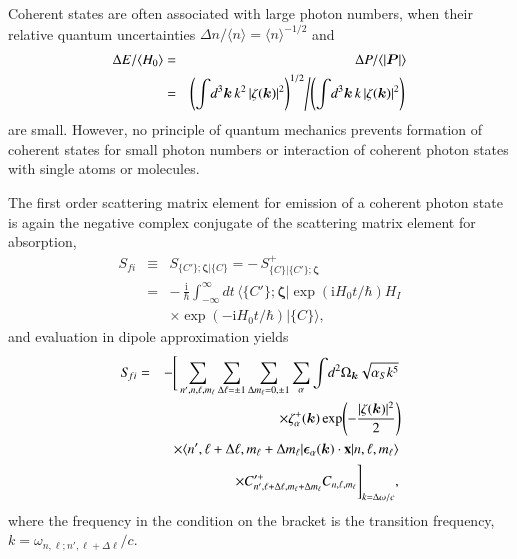 \documentclass[final,3p,12pt]{elsarticle3}
\begin{document}
Coherent states are often associated with large photon numbers,
when their relative quantum uncertainties  
$\Delta n/\langle n\rangle=\langle n\rangle^{-1/2}$ and
\begin{eqnarray*}
\Delta E/\langle H_0\rangle&=&\Delta P/\langle|\bm{P}|\rangle
\\
&=&\left(\int\!d^3\bm{k}\,k^2
\left|\zeta(\bm{k})\right|^2\right)^{1/2}\!\left/
\left(\int\!d^3\bm{k}\,k
\left|\zeta(\bm{k})\right|^2\right)\right.
\end{eqnarray*}
are small.
However, no principle of quantum mechanics prevents formation of coherent
states for small photon numbers or interaction of coherent photon
states with single atoms or molecules.

The first order scattering matrix element for emission of a coherent photon 
state is again the negative complex conjugate of the 
scattering matrix element for absorption,
\begin{eqnarray}\nonumber
S_{\!fi}&\equiv& S_{\{C'\};\bm{\zeta}|\{C\}}=-\,S^+_{\{C\}|\{C'\};\bm{\zeta}}
\\ \nonumber
&=&-\,\frac{\mathrm{i}}{\hbar}\int_{-\infty}^\infty\!dt\,\bm{\langle}
\{C'\};\bm{\zeta}\bm{|}
\exp(\mathrm{i}H_0t/\hbar) H_I
\\ \label{eq:linec1}
&&\times\exp(-\mathrm{i}H_0t/\hbar)
\bm{|}\{C\}\bm{\rangle},
\end{eqnarray}
and evaluation in dipole approximation yields 
\begin{eqnarray}\nonumber
S_{\!fi}&=&-\Bigg[\sum_{n',n,\ell,m_\ell}\sum_{\Delta\ell=\pm 1}\sum_{\Delta m_\ell=0,\pm 1}
\sum_\alpha\int\!d^2\Omega_{\bm{k}} \sqrt{\alpha_S k^5}
\\ \nonumber
&&\times
\zeta^+_\alpha(\bm{k})
\exp\!\left(-\frac{|\zeta(\bm{k})|^2}{2}\right)\!
\\ \nonumber
&&\times
\langle n',\ell+\Delta\ell,m_\ell+\Delta m_\ell|
\bm{\epsilon}_\alpha(\bm{k})\cdot\mathrm{\bf x}|n,\ell,m_\ell\rangle
\\ \label{eq:linec3}
&&\times
C'^+_{n',\ell+\Delta\ell,m_\ell+\Delta m_\ell}C_{n,\ell,m_\ell}\Bigg]_{k=\Delta\omega/c},
\end{eqnarray}
where the frequency in the condition on the bracket is the
transition frequency, $k=\omega_{n,\ell;n',\ell+\Delta\ell}/c$.
\end{document}
